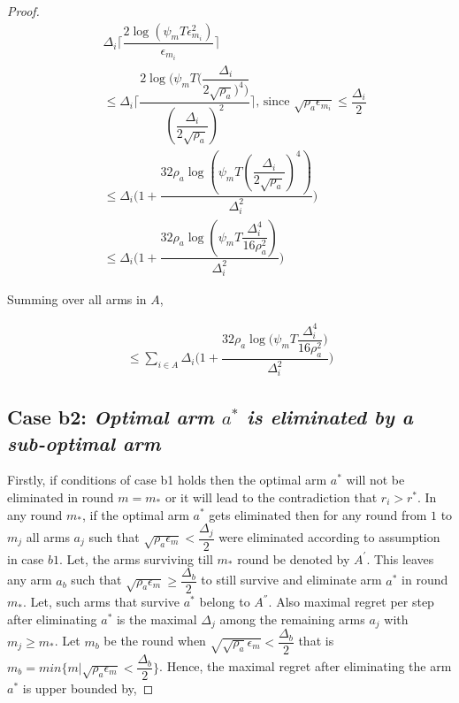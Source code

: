 \begin{proof}
\begin{align*}
&\Delta_{i}\bigg\lceil\dfrac{2\log{(\psi_{m}T\epsilon_{m_{i}}^{2})}}{\epsilon_{m_{i}}}\bigg\rceil\\
&\leq\Delta_{i}\bigg\lceil\dfrac{2\log{(\psi_{m}T(\dfrac{\Delta_{i}}{2\sqrt{\rho_{a}})^{4})}}}{(\dfrac{\Delta_{i}}{2\sqrt{\rho_{a}}})^{2}}\bigg\rceil \text{, since } \sqrt{\rho_{a}\epsilon_{m_{i}}}\leq\dfrac{\Delta_{i}}{2}\\
&\leq\Delta_{i}\bigg(1+\dfrac{32\rho_{a}\log{(\psi_{m}T(\dfrac{\Delta_{i}}{2\sqrt{\rho_{a}}})^{4})}}{\Delta_{i}^{2}}\bigg)
\\
&\leq\Delta_{i}\bigg(1+\dfrac{32\rho_{a}\log{(\psi_{m}T\dfrac{\Delta_{i}^{4}}{16\rho_{a}^{2}})}}{\Delta_{i}^{2}}\bigg)
\end{align*} 
 

Summing over all arms in $A$,
 
\begin{align*}
\leq\sum_{i\in A}\Delta_{i}\bigg(1+\dfrac{32\rho_{a}\log{(\psi_{m}T\dfrac{\Delta_{i}^{4}}{16\rho_{a}^{2}}})}{\Delta_{i}^{2}}\bigg)
\end{align*}


\subsection*{Case b2: \textit{Optimal arm $a^{*}$ is eliminated by a sub-optimal arm  }}


	Firstly, if conditions of case b1 holds then the optimal arm $a^{*}$ will not be eliminated in round $m=m_{*}$ or it will lead to the contradiction that $r_{i}>r^{*}$. In any round $m_{*}$, if the optimal arm $a^{*}$ gets eliminated then for any round from $1$ to $m_{j}$ all arms $a_{j}$ such that $\sqrt{\rho_{a}\epsilon_{m}}<\dfrac{\Delta_{j}}{2}$ were eliminated according to assumption in case $b1$. Let, the arms surviving till $m_{*}$ round be denoted by $A^{'}$. This leaves any arm $a_{b}$ such that $\sqrt{\rho_{a}\epsilon_{m}}\geq\dfrac{\Delta_{b}}{2}$ to still survive and eliminate arm $a^{*}$ in round $m_{*}$. Let, such arms that survive $a^{*}$ belong to $A^{''}$. Also maximal regret per step after eliminating $a^{*}$ is the maximal $\Delta_{j}$ among the remaining arms $a_{j}$ with $m_{j}\geq m_{*}$.  Let $m_{b}$ be the round when $\sqrt{\sqrt{\rho_{a}}\epsilon_{m}}<\dfrac{\Delta_{b}}{2}$ that is $m_{b}=min\lbrace m|\sqrt{\rho_{a}\epsilon_{m}}<\dfrac{\Delta_{b}}{2}\rbrace$. Hence, the 
maximal regret after eliminating the arm $a^{*}$ is upper bounded by, 
 

\end{proof}
